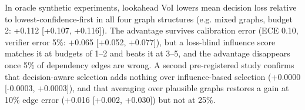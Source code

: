 In oracle synthetic experiments, lookahead VoI lowers mean decision loss relative to lowest-confidence-first in all four graph structures (e.g. mixed graphs, budget 2: +0.112 [+0.107, +0.116]). The advantage survives calibration error (ECE 0.10, verifier error 5\%: +0.065 [+0.052, +0.077]), but a loss-blind influence score matches it at budgets of 1--2 and beats it at 3--5, and the advantage disappears once 5\% of dependency edges are wrong. A second pre-registered study confirms that decision-aware selection adds nothing over influence-based selection (+0.0000 [-0.0003, +0.0003]), and that averaging over plausible graphs restores a gain at 10\% edge error (+0.016 [+0.002, +0.030]) but not at 25\%.
